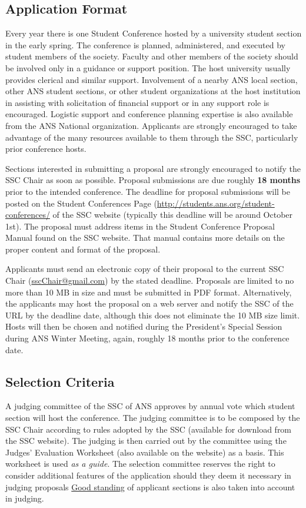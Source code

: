 \documentclass[12pt]{article}
\begin{document}
\subsection{Application Format}
Every year there is one Student Conference hosted by a university student section in the early spring.
The conference is planned, administered, and executed by student members of the society.
Faculty and other members of the society should be involved only in a guidance or support position.
The host university usually provides clerical and similar support.
Involvement of a nearby ANS local section, other ANS student sections, or other student organizations at the host institution in assisting with solicitation of financial support or in any support role is encouraged.
Logistic support and conference planning expertise is also available from the ANS National organization.
Applicants are strongly encouraged to take advantage of the many resources available to them through the SSC, particularly prior conference hosts.

Sections interested in submitting a proposal are strongly encouraged to notify the SSC Chair as soon as possible.
Proposal submissions are due roughly \textbf{18 months} prior to the intended conference.
The deadline for proposal submissions will be posted on the Student Conferences Page (\href{http://students.ans.org/student-conferences/}{http://students.ans.org/student-conferences/}  of the SSC website (typically this deadline will be around October 1st).
The proposal must address items in the Student Conference Proposal Manual found on the SSC website.
That manual contains more details on the proper content and format of the proposal.

Applicants must send an electronic copy of their proposal to the current SSC Chair (\href{mailto:sscChair@gmail.com}{sscChair@gmail.com}) by the stated deadline.
Proposals are limited to no more than 10 MB in size and must be submitted in PDF format.
Alternatively, the applicants may host the proposal on a web server and notify the SSC of the URL by the deadline date, although this does not eliminate the 10 MB size limit.
Hosts will then be chosen and notified during the President's Special Session during ANS Winter Meeting, again, roughly 18 months prior to the conference date.

\subsection{Selection Criteria}
A judging committee of the SSC of ANS approves by annual vote which student section will host the conference.
The judging committee is to be composed by the SSC Chair  according to rules adopted by the SSC (available for download from the SSC website).
The judging is then carried out by the committee using the Judges' Evaluation Worksheet (also available on the website) as a basis.
This worksheet is used \emph{as a guide}.
The selection committee reserves the right to consider additional features of the application should they deem it necessary in judging proposals
\href{http://students.ans.org/section-standing/}{Good standing} of applicant sections is also taken into account in judging.
\end{document}
